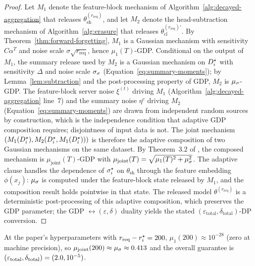 \begin{proof}[Proof]
Let $M_1$ denote the feature-block mechanism of
Algorithm~\ref{alg:decayed-aggregation} that releases
$\theta_\mathrm{sh}^{(r_\mathrm{req})}$, and let $M_2$ denote the head-subtraction
mechanism of Algorithm~\ref{alg:erasure} that releases
$\theta_\mathrm{cl}^{(r_\mathrm{req})\prime}$. By
Theorem~\ref{thm:forward-forgetting}, $M_1$ is a Gaussian mechanism with sensitivity
$C\alpha^T$ and noise scale $\sigma \sqrt{r_\mathrm{req}}$, hence $\mu_1(T)$-GDP.
Conditional on the output of $M_1$, the summary release used by $M_2$ is a Gaussian
mechanism on $D_i^{\star}$ with sensitivity $\Delta$ and noise scale $\sigma_\sigma$
(Equation~\eqref{eq:summary-moments}); by Lemma~\ref{lem:subtraction} and the
post-processing property of GDP, $M_2$ is $\mu_\sigma$-GDP. The feature-block server
noise $\xi^{(t)}$ driving $M_1$ (Algorithm~\ref{alg:decayed-aggregation} line~7) and
the summary noise $\eta^c$ driving $M_2$ (Equation~\eqref{eq:summary-moments}) are
drawn from independent random sources by construction, which is the independence
condition that adaptive GDP composition requires; disjointness of input data is not.
The joint mechanism $(M_1(D_i^{\star}), M_2(D_i^{\star}, M_1(D_i^{\star})))$ is therefore
the adaptive composition of two Gaussian mechanisms on the same dataset. By
Theorem~3.2 of \cite{dong2019gaussian}, the composed mechanism is
$\mu_\mathrm{joint}(T)$-GDP with $\mu_\mathrm{joint}(T) = \sqrt{\mu_1(T)^2 +
\mu_\sigma^2}$. The adaptive clause handles the dependence of $\sigma_i^{\star}$ on
$\theta_\mathrm{sh}$ through the feature embedding $\phi(x_j)$: $\mu_\sigma$ is
computed under the feature-block state released by $M_1$, and the composition result
holds pointwise in that state. The released model $\theta^{(r_\mathrm{req})}$ is a
deterministic post-processing of this adaptive composition, which preserves the GDP
parameter; the GDP $\leftrightarrow (\varepsilon, \delta)$ duality yields the stated
$(\varepsilon_\mathrm{total}, \delta_\mathrm{total})$-DP conversion.
\end{proof}

At the paper's hyperparameters with $r_\mathrm{req} - r_i^{\star} = 200$,
$\mu_1(200) \approx 10^{-28}$ (zero at machine precision), so
$\mu_\mathrm{joint}(200) \approx \mu_\sigma \approx 0.413$ and the overall guarantee
is $(\varepsilon_\mathrm{total}, \delta_\mathrm{total}) = (2.0, 10^{-5})$.


